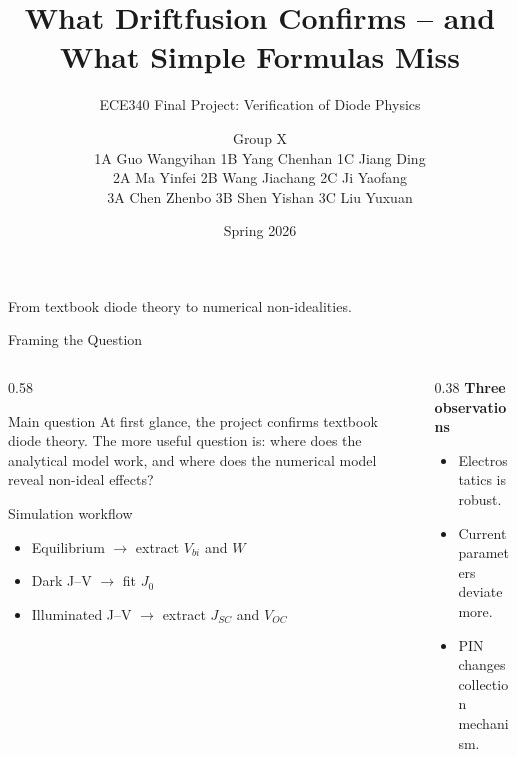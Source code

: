 \documentclass[aspectratio=169,11pt]{beamer}
\title[Driftfusion Diode Physics]{What Driftfusion Confirms -- and What Simple Formulas Miss}
\subtitle{ECE340 Final Project: Verification of Diode Physics}
\author[Group X]{\texorpdfstring{
    Group X \\
    1A Guo Wangyihan \quad 1B Yang Chenhan \quad 1C Jiang Ding \\
    2A Ma Yinfei \quad 2B Wang Jiachang \quad 2C Ji Yaofang \\
    3A Chen Zhenbo \quad 3B Shen Yishan \quad 3C Liu Yuxuan
}{Group X}}
\institute[ZJUI]{ZJUI Institute, Zhejiang University}
\date{Spring 2026}
\newcommand{\jzero}{J_0}
\newcommand{\jsc}{J_{SC}}
\newcommand{\voc}{V_{OC}}
\newcommand{\vbi}{V_{bi}}
\begin{document}
\begin{frame}
    \titlepage
    \vspace{-0.35cm}
    \centering
    \small From textbook diode theory to numerical non-idealities.
\end{frame}

\begin{frame}{Framing the Question}
\begin{columns}[T]
\begin{column}{0.58\textwidth}
\begin{block}{Main question}
\small
At first glance, the project confirms textbook diode theory. The more useful question is: where does the analytical model work, and where does the numerical model reveal non-ideal effects?
\end{block}

\begin{block}{Simulation workflow}
\begin{itemize}
    \item Equilibrium $\rightarrow$ extract $\vbi$ and $W$
    \item Dark J--V $\rightarrow$ fit $\jzero$
    \item Illuminated J--V $\rightarrow$ extract $\jsc$ and $\voc$
\end{itemize}
\end{block}
\end{column}

\begin{column}{0.38\textwidth}
\textbf{Three observations}
\begin{itemize}
    \item Electrostatics is robust.
    \item Current parameters deviate more.
    \item PIN changes collection mechanism.
\end{itemize}
\end{column}
\end{columns}
\end{frame}
\end{document}
